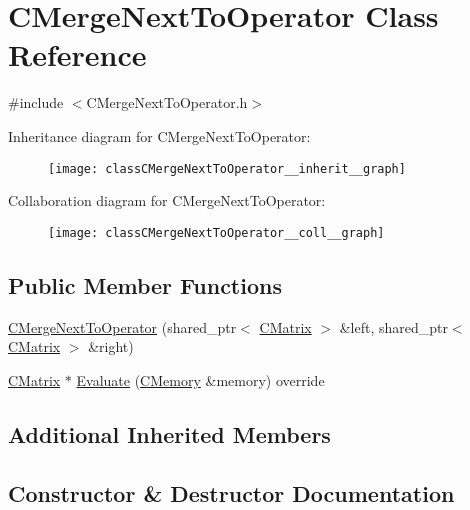 \hypertarget{classCMergeNextToOperator}{}\section{C\+Merge\+Next\+To\+Operator Class Reference}
\label{classCMergeNextToOperator}


{\ttfamily \#include $<$C\+Merge\+Next\+To\+Operator.\+h$>$}



Inheritance diagram for C\+Merge\+Next\+To\+Operator\+:\nopagebreak
\begin{figure}[H]
\begin{center}
\leavevmode
\texttt{[image: classCMergeNextToOperator\_\_inherit\_\_graph]}
\end{center}
\end{figure}


Collaboration diagram for C\+Merge\+Next\+To\+Operator\+:\nopagebreak
\begin{figure}[H]
\begin{center}
\leavevmode
\texttt{[image: classCMergeNextToOperator\_\_coll\_\_graph]}
\end{center}
\end{figure}
\subsection*{Public Member Functions}
\begin{DoxyCompactItemize}
\item 
\hyperlink{classCMergeNextToOperator_a83123623e3c2094dad8eda046a171da9}{C\+Merge\+Next\+To\+Operator} (shared\+\_\+ptr$<$ \hyperlink{classCMatrix}{C\+Matrix} $>$ \&left, shared\+\_\+ptr$<$ \hyperlink{classCMatrix}{C\+Matrix} $>$ \&right)
\item 
\hyperlink{classCMatrix}{C\+Matrix} $\ast$ \hyperlink{classCMergeNextToOperator_ab914c0ae204819b6f5e9d9857acd1854}{Evaluate} (\hyperlink{classCMemory}{C\+Memory} \&memory) override
\end{DoxyCompactItemize}
\subsection*{Additional Inherited Members}


\subsection{Constructor \& Destructor Documentation}
